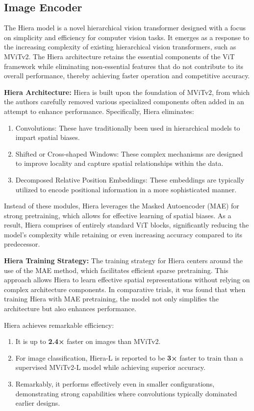 \documentclass{article} %
\begin{document}
\subsection{Image Encoder}
The Hiera model is a novel hierarchical vision transformer designed with a focus on simplicity and efficiency for computer vision tasks. It emerges as a response to the increasing complexity of existing hierarchical vision transformers, such as MViTv2. The Hiera architecture retains the essential components of the ViT framework while eliminating non-essential features that do not contribute to its overall performance, thereby achieving faster operation and competitive accuracy.

{\bf Hiera Architecture:}
Hiera is built upon the foundation of MViTv2, from which the authors carefully removed various specialized components often added in an attempt to enhance performance. Specifically, Hiera eliminates:
\begin{enumerate}
   \item Convolutions: These have traditionally been used in hierarchical models to impart spatial biases.
   \item Shifted or Cross-shaped Windows: These complex mechanisms are designed to improve locality and capture spatial relationships within the data.
   \item Decomposed Relative Position Embeddings: These embeddings are typically utilized to encode positional information in a more sophisticated manner.
\end{enumerate}

Instead of these modules, Hiera leverages the Masked Autoencoder (MAE) for strong pretraining, which allows for effective learning of spatial biases. As a result, Hiera comprises of entirely standard ViT blocks, significantly reducing the model's complexity while retaining or even increasing accuracy compared to its predecessor.

{\bf Hiera Training Strategy:}
The training strategy for Hiera centers around the use of the MAE method, which facilitates efficient sparse pretraining. This approach allows Hiera to learn effective spatial representations without relying on complex architecture components. In comparative trials, it was found that when training Hiera with MAE pretraining, the model not only simplifies the architecture but also enhances performance.

Hiera achieves remarkable efficiency:
\begin{enumerate}
   \item It is up to {\bf 2.4×} faster on images than MViTv2.
   \item For image classification, Hiera-L is reported to be {\bf 3×} faster to train than a supervised MViTv2-L model while achieving superior accuracy.
   \item Remarkably, it performs effectively even in smaller configurations, demonstrating strong capabilities where convolutions typically dominated earlier designs.
\end{enumerate}
\end{document}
